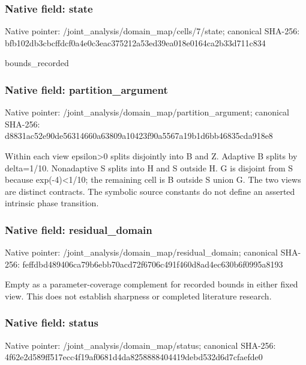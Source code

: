 \documentclass[10pt,a4paper]{article}
\begin{document}
\subsubsection{Native field: state}
Native pointer: /joint\_\allowbreak{}analysis/domain\_\allowbreak{}map/cells/7/state; canonical SHA-256: bfb102db3cbcffdcf0a4e0c3eac375212a53ed39ea018e0164ca2b33d711c834

\begingroup\raggedright\sloppy bounds\_\allowbreak{}recorded\par\endgroup

\subsubsection{Native field: partition\_\allowbreak{}argument}
Native pointer: /joint\_\allowbreak{}analysis/domain\_\allowbreak{}map/partition\_\allowbreak{}argument; canonical SHA-256: d8831ac52e90de56314660a63809a10423f90a5567a19b1d6bb46835cda918e8

\begingroup\raggedright\sloppy Within each view epsilon>0 splits disjointly into B and Z. Adaptive B splits by delta=\allowbreak{}1/\allowbreak{}10. Nonadaptive S splits into H and S outside H. G is disjoint from S because exp(-4)<1/\allowbreak{}10;\allowbreak{} the remaining cell is B outside S union G. The two views are distinct contracts. The symbolic source constants do not define an asserted intrinsic phase transition.\par\endgroup

\subsubsection{Native field: residual\_\allowbreak{}domain}
Native pointer: /joint\_\allowbreak{}analysis/domain\_\allowbreak{}map/residual\_\allowbreak{}domain; canonical SHA-256: feffdbd489406ca79b6ebb70acd72f6706c491f460d8ad4ec630b6f0995a8193

\begingroup\raggedright\sloppy Empty as a parameter-coverage complement for recorded bounds in either fixed view. This does not establish sharpness or completed literature research.\par\endgroup

\subsubsection{Native field: status}
Native pointer: /joint\_\allowbreak{}analysis/domain\_\allowbreak{}map/status; canonical SHA-256: 4f62e2d589ff517ecc4f19af0681d4da8258888404419debd532d6d7cfaefde0
\end{document}
